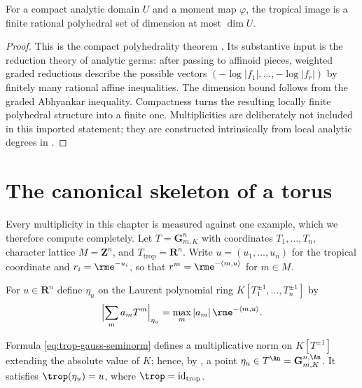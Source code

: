\begin{theorem}\label{thm:analytic-tropical-polyhedrality}
For a compact analytic domain $U$ and a moment map $\varphi$, the tropical
image is a finite rational polyhedral set of dimension at most $\dim U$.
\end{theorem}
\begin{proof}
This is the compact polyhedrality theorem
\cite[Theorem~12.2.4]{CLD25}.  Its substantive input is the reduction theory
of analytic germs: after passing to affinoid pieces, weighted graded
reductions describe the possible vectors
$(-\log|f_1|,\ldots,-\log|f_r|)$ by finitely many rational affine
inequalities.  The dimension bound follows from the graded Abhyankar
inequality.  Compactness turns the resulting locally finite polyhedral
structure into a finite one.  Multiplicities are deliberately not included
in this imported statement; they are constructed intrinsically from local
analytic degrees in .
\end{proof}

\section{The canonical skeleton of a torus}
\label{sec:trop-torus}

Every multiplicity in this chapter is measured against one example, which we
therefore compute completely. Let $T=\mathbf G_{m,K}^n$ with coordinates
$T_1,\ldots,T_n$, character lattice $M=\mathbf Z^n$, and
$T_{\mathrm{trop}}=\mathbf R^n$. Write $u=(u_1,\ldots,u_n)$ for the
tropical coordinate and $r_i=\rme^{-u_i}$, so that $r^m=\rme^{-\langle
m,u\rangle}$ for $m\in M$.

\begin{definition}
\label{def:trop-gauss-point}
For $u\in\mathbf R^n$ define $\eta_u$ on the Laurent polynomial ring
$K[T_1^{\pm1},\ldots,T_n^{\pm1}]$ by
\begin{equation}
\label{eq:trop-gauss-seminorm}
 \Bigl|\sum_ma_mT^m\Bigr|_{\eta_u}
 =\max_m|a_m|\,\rme^{-\langle m,u\rangle}.
\end{equation}
\end{definition}

\begin{lemma}
\label{lem:trop-gauss-multiplicative}
Formula \eqref{eq:trop-gauss-seminorm} defines a multiplicative norm on
$K[T^{\pm1}]$ extending the absolute value of $K$; hence, by
, a point
$\eta_u\in T^{\An}=\mathbf G_{m,K}^{n,\An}$. It satisfies
$\trop(\eta_u)=u$, where $\trop=\mathrm{id}_{\mathrm{trop}}$.
\end{lemma}

